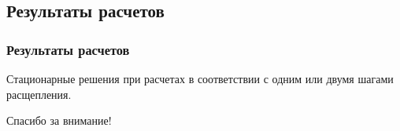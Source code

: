 \documentclass[9pt, apectratio=43,unicode]{beamer}
\begin{document}
\subsection{Результаты расчетов}
\begin{frame}\frametitle{Результаты расчетов}

Стационарные решения при расчетах в соответствии с одним или двумя шагами расщепления.

\begin{figure}[H]
\begin{minipage}[c]{0.490\linewidth}
\flushleft
{}
\end{minipage}
\hfill
\begin{minipage}[c]{0.490\linewidth}
\flushleft
{}
\end{minipage}
\end{figure}


\end{frame}




\begin{frame}[plain]
  \begin{center}
  {\Huge Спасибо за внимание!}
  \end{center}
\end{frame}
\end{document}
